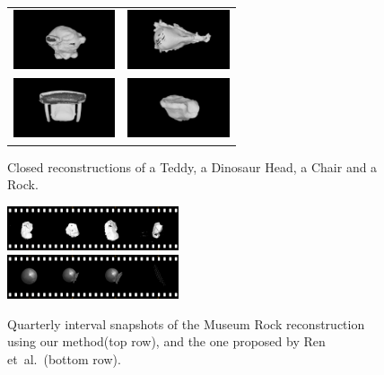 \begin{figure}[!t]
	\centering
	\begin{tabular}{cc}
		\includegraphics[width=3cm]{screenshots/untextured/teddy_top00.png}&
		\includegraphics[width=3cm]{screenshots/untextured/dino_top00.png}\\
		\includegraphics[width=3cm]{screenshots/untextured/chair_top00.png}&
		\includegraphics[width=3cm]{screenshots/untextured/rock_top00.png}\\
	\end{tabular}
    \vspace{-3mm}
	\caption{
		Closed reconstructions of a Teddy, a Dinosaur Head, a Chair and a Rock.
	}
	\label{fig:top_shots}
\end{figure}

\begin{figure}[!t]
	\centering
		\includegraphics[width=0.45\textwidth]{filmstrips/rock.png} \\
		\vspace{0.5mm}
	    \includegraphics[width=0.45\textwidth]{filmstrips/rock_s3d_large.png}
	\caption{
		Quarterly interval snapshots of the Museum Rock reconstruction using our method(top row), and the one proposed by Ren et~al.~\cite{Ren2013}(bottom row).
	}
	\label{fig:rockComparison}
\end{figure}


